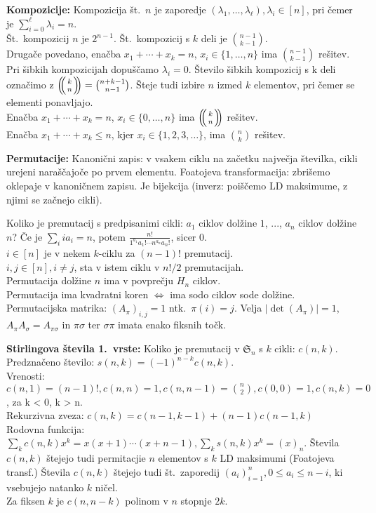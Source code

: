 \documentclass[a4paper, oneside, 12pt]{article}
\theoremstyle{definition}
\def\multiset#1#2{\ensuremath{\left(\kern-.3em\left(\genfrac{}{}{0pt}{}{#1}{#2}\right)\kern-.3em\right)}}
\newcommand{\per}{\mathfrak{S}}
\begin{document}
\textbf{Kompozicije:} Kompozicija št.~$n$ je zaporedje $(\lambda_1, \ldots, \lambda_\ell),
\lambda_i \in [n]$, pri čemer je $\sum_{i=0}^\ell \lambda_i = n$. \\
Št.~kompozicij $n$ je $2^{n-1}$. Št.~kompozicij s $k$ deli je $\binom{n-1}{k-1}$. \\
Drugače povedano, enačba $x_1 + \cdots + x_k = n$, $x_i \in \{1, \ldots, n\}$ ima $\binom{n-1}{k-1}$ rešitev. \\
Pri šibkih kompozicijah dopuščamo $\lambda_i = 0$. Število šibkih kompozicij s k deli
označimo z $\multiset{k}{n} = \binom{n+k-1}{n-1}$. Šteje tudi izbire $n$ izmed $k$ elementov,
pri čemer se elementi ponavljajo. \\
Enačba $x_1 + \cdots + x_k = n$, $x_i \in \{0, \ldots, n\}$ ima $\multiset{k}{n}$ rešitev.\\
Enačba $x_1 + \cdots + x_k \leq n$, kjer $x_i \in \{1, 2, 3, \ldots\}$, ima $\binom{n}{k}$ rešitev.

\textbf{Permutacije:} Kanonični zapis: v vsakem ciklu na začetku največja številka,
cikli urejeni naraščajoče po prvem elementu. Foatojeva transformacija: zbrišemo
oklepaje v kanoničnem zapisu. Je bijekcija (inverz: poiščemo LD maksimume, z
njimi se začnejo cikli).

Koliko je premutacij s predpisanimi cikli: $a_1$ ciklov dolžine $1$, ..., $a_n$ ciklov dolžine $n$?
Če je $\sum_i i a_i = n$, potem $\displaystyle \frac{n!}{1^{a_1} a_1! \cdots n^{a_n}a_n!}$, sicer 0.\\
$i\in[n]$ je v nekem $k$-ciklu za $(n-1)!$ premutacij.\\
$i, j \in [n], i \neq j$, sta v istem ciklu v $n!/2$ premutacijah.\\
Permutacija dolžine $n$ ima v povprečju $H_n$ ciklov.\\
Permutacija ima kvadratni koren $\iff$ ima sodo ciklov sode dolžine.\\
Permutacijska matrika: $(A_{\pi})_{i, j} = 1$ ntk.~$\pi(i) = j$. Velja
$|\det(A_{\pi})| = 1$, $A_{\pi} A_{\sigma} = A_{\pi \sigma}$ in $\pi \sigma$ ter
$\sigma \pi$ imata enako fiksnih točk.

\textbf{Stirlingova števila 1.~vrste:}
Koliko je premutacij v $\per_n$ s $k$ cikli: $c(n, k)$. \\
Predznačeno število: $s(n, k) = (-1)^{n-k} c(n, k)$. \\
Vrenosti: $c(n, 1) = (n-1)!, c(n, n) = 1, c(n, n-1) = \binom{n}{2}, c(0, 0) = 1, c(n, k) = 0$, za k < 0, k > n. \\
Rekurzivna zveza: $c(n, k) = c(n-1, k-1) + (n-1) c(n-1, k)$ \\
Rodovna funkcija: $\sum_k c(n, k) x^k = x(x+1)\cdots(x+n-1), \sum_k s(n, k) x^k = (x)_n$.
Števila $c(n, k)$ štejejo tudi permitacjie $n$ elementov s $k$ LD maksimumi (Foatojeva transf.)
Števila $c(n, k)$ štejejo tudi št.~zaporedij $(a_i)_{i=1}^n, 0 \leq a_i \leq n-i$, ki vsebujejo natanko $k$ ničel.\\
Za fiksen $k$ je $c(n, n-k)$ polinom v $n$ stopnje $2k$.
\end{document}
